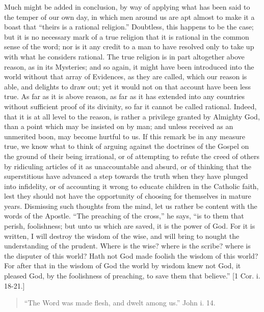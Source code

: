 Much might be added in conclusion, by way of applying what has been
said to the temper of our own day, in which men around us are apt
almost to make it a boast that ``theirs is a rational
religion.'' Doubtless, this happens to be the case; but it is no
necessary mark of a true religion that it is rational in the common
sense of the word; nor is it any credit to a man to have resolved only
to take up with what he considers rational. The true religion is in
part altogether above reason, as in its Mysteries; and so again, it
might have been introduced into the world without that array of
Evidences, as they are called, which our reason is able, and delights
to draw out; yet it would not on that account have been less true. As
far as it is above reason, as far as it has extended into any
countries without sufficient proof of its divinity, so far it cannot
be called rational. Indeed, that it is at all level to the reason, is
rather a privilege granted by Almighty God, than a point which may be
insisted on by man; and unless received as an unmerited boon, may
become hurtful to us. If this remark be in any measure true, we know
what to think of arguing against the doctrines of the Gospel on the
ground of their being irrational, or of attempting to refute the creed
of others by ridiculing articles of it as unaccountable and absurd, or
of thinking that the superstitious have advanced a step towards the
truth when they have plunged into infidelity, or of accounting it
wrong to educate children in the Catholic faith, lest they should not
have the opportunity of choosing for themselves in mature years.
Dismissing such thoughts from the mind, let us rather be content with
the words of the Apostle. ``The preaching of the cross,'' he
says, ``is to them that perish, foolishness; but unto us which are
saved, it is the power of God. For it is written, I will destroy the
wisdom of the wise, and will bring to nought the understanding of the
prudent. Where is the wise? where is the scribe? where is the disputer
of this world? Hath not God made foolish the wisdom of this world? For
after that in the wisdom of God the world by wisdom knew not God, it
pleased God, by the foolishness of preaching, to save them that
believe.'' [1 Cor. i. 18-21.]


\begin{quote}

``The Word was made flesh, and dwelt among us.'' John i.
14.

\end{quote}

